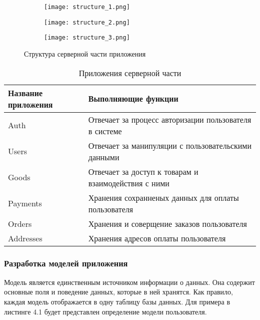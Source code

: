 \begin{figure}[h!]
    \begin{subfigure}[b]{0.3\textwidth}
    \centering
    \texttt{[image: structure\_1.png]}
    \caption{}
    \end{subfigure}
    \begin{subfigure}[b]{0.3\textwidth}
    \centering
    \texttt{[image: structure\_2.png]}
    \caption{}
    \end{subfigure}
    \begin{subfigure}[b]{0.3\textwidth}
    \centering
    \texttt{[image: structure\_3.png]}
    \caption{}
    \end{subfigure}
    \caption{ Структура серверной части приложения }
    \label{back:struct}
\end{figure}

\begin{table}
    \caption{Приложения серверной части}
    \begin{tabular}{ | l | p{6cm} | }
        \hline
        Название приложения & Выполняющие функции \\ \hline
        Auth & Отвечает за процесс авторизации пользователя в системе \\ \hline
        Users & Отвечает за манипуляции с пользовательскими данными \\ \hline
        Goods & Отвечает за доступ к товарам и взаимодействия с ними \\ \hline
        Payments & Хранения сохранненых данных для оплаты пользователя\\ \hline
        Orders & Хранения и соверщение заказов пользователя \\ \hline
        Addresses & Хранения адресов оплаты пользователя \\ \hline
    \end{tabular}
\end{table}

\subsubsection{Разработка моделей приложения}\hfill

Модель является единственным источником информации о данных.
Она содержит основные поля и поведение данных, которые в ней хранятся.
Как правило, каждая модель отображается в одну таблицу базы данных.
Для примера в листинге 4.1 будет представлен определение модели пользователя.

